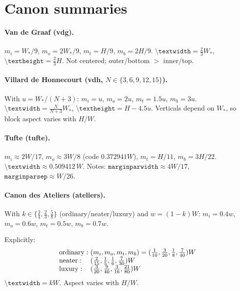 \documentclass[11pt, twoside, openany]{book}
\newcommand{\cmd}[1]{\texttt{\textbackslash #1}}
\begin{document}
\section*{Canon summaries}\label{sec:formulary2}

\paragraph{Van de Graaf (vdg).}
$m_i = W_\ast/9$, $m_o = 2W_\ast/9$, $m_t = H/9$, $m_b = 2H/9$. $\cmd{textwidth} = \tfrac{2}{3}W_\ast$, $\cmd{textheight} = \tfrac{2}{3}H$. Not centered; outer/bottom $>$ inner/top.

\paragraph{Villard de Honnecourt (vdh, $N\in\{3,6,9,12,15\}$).}
With $u = W_\ast/(N+3)$: $m_i = u$, $m_o = 2u$, $m_t = 1.5u$, $m_b = 3u$. $\cmd{textwidth} = \tfrac{N}{N+3}W_\ast$, $\cmd{textheight} = H - 4.5u$. Verticals depend on $W_\ast$, so block aspect varies with $H/W$.

\paragraph{Tufte (tufte).}
$m_i \approx 2W/17$, $m_o \approx 3W/8$ (code $0.372941W$), $m_t = H/11$, $m_b = 3H/22$. $\cmd{textwidth} \approx 0.509412\,W$. Notes: $\texttt{marginparwidth} \approx 4W/17$, $\texttt{marginparsep} \approx W/26$.

\paragraph{Canon des Ateliers (ateliers).}
With $k \in \{\tfrac{3}{4}, \tfrac{2}{3}, \tfrac{5}{8}\}$ (ordinary/neater/luxury) and $w = (1-k)W$: $m_i = 0.4w$, $m_o = 0.6w$, $m_t = 0.5w$, $m_b = 0.7w$.

Explicitly:
\[
	\begin{array}{l@{\ }l}
		\mathrm{ordinary:} & (m_i,m_o,m_t,m_b) = (\tfrac{1}{10},\tfrac{3}{20},\tfrac{1}{8},\tfrac{7}{40})W \\
		\mathrm{neater:}   & (\tfrac{2}{15},\tfrac{1}{5},\tfrac{1}{6},\tfrac{7}{30})W                      \\
		\mathrm{luxury:}   & (\tfrac{3}{20},\tfrac{9}{40},\tfrac{3}{16},\tfrac{21}{80})W                   
	\end{array}
\]
$\cmd{textwidth} = kW$. Aspect varies with $H/W$.
\end{document}

